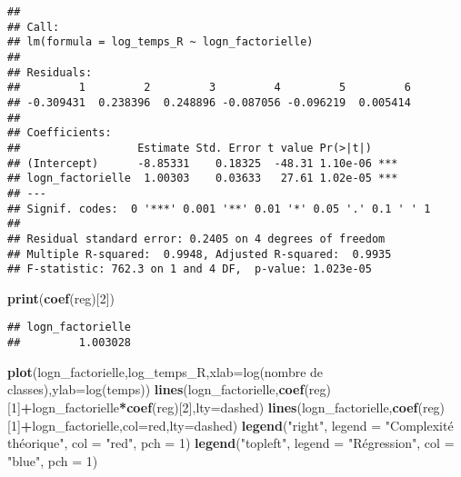 \documentclass[
]{article}
\newenvironment{Shaded}{\begin{snugshade}}{\end{snugshade}}
\newcommand{\AttributeTok}[1]{\textcolor[rgb]{0.13,0.29,0.53}{#1}}
\newcommand{\DecValTok}[1]{\textcolor[rgb]{0.00,0.00,0.81}{#1}}
\newcommand{\FunctionTok}[1]{\textcolor[rgb]{0.13,0.29,0.53}{\textbf{#1}}}
\newcommand{\NormalTok}[1]{#1}
\newcommand{\SpecialCharTok}[1]{\textcolor[rgb]{0.81,0.36,0.00}{\textbf{#1}}}
\newcommand{\StringTok}[1]{\textcolor[rgb]{0.31,0.60,0.02}{#1}}
\begin{document}
\begin{verbatim}
## 
## Call:
## lm(formula = log_temps_R ~ logn_factorielle)
## 
## Residuals:
##         1         2         3         4         5         6 
## -0.309431  0.238396  0.248896 -0.087056 -0.096219  0.005414 
## 
## Coefficients:
##                  Estimate Std. Error t value Pr(>|t|)    
## (Intercept)      -8.85331    0.18325  -48.31 1.10e-06 ***
## logn_factorielle  1.00303    0.03633   27.61 1.02e-05 ***
## ---
## Signif. codes:  0 '***' 0.001 '**' 0.01 '*' 0.05 '.' 0.1 ' ' 1
## 
## Residual standard error: 0.2405 on 4 degrees of freedom
## Multiple R-squared:  0.9948, Adjusted R-squared:  0.9935 
## F-statistic: 762.3 on 1 and 4 DF,  p-value: 1.023e-05
\end{verbatim}

\begin{Shaded}
\begin{Highlighting}[]
\FunctionTok{print}\NormalTok{(}\FunctionTok{coef}\NormalTok{(reg)[}\DecValTok{2}\NormalTok{])}
\end{Highlighting}
\end{Shaded}

\begin{verbatim}
## logn_factorielle 
##         1.003028
\end{verbatim}

\begin{Shaded}
\begin{Highlighting}[]
\FunctionTok{plot}\NormalTok{(logn\_factorielle,log\_temps\_R,}\AttributeTok{xlab=}\StringTok{\textquotesingle{}log(nombre de classes)\textquotesingle{}}\NormalTok{,}\AttributeTok{ylab=}\StringTok{\textquotesingle{}log(temps)\textquotesingle{}}\NormalTok{)}
\FunctionTok{lines}\NormalTok{(logn\_factorielle,}\FunctionTok{coef}\NormalTok{(reg)[}\DecValTok{1}\NormalTok{]}\SpecialCharTok{+}\NormalTok{logn\_factorielle}\SpecialCharTok{*}\FunctionTok{coef}\NormalTok{(reg)[}\DecValTok{2}\NormalTok{],}\AttributeTok{lty=}\StringTok{\textquotesingle{}dashed\textquotesingle{}}\NormalTok{)}
\FunctionTok{lines}\NormalTok{(logn\_factorielle,}\FunctionTok{coef}\NormalTok{(reg)[}\DecValTok{1}\NormalTok{]}\SpecialCharTok{+}\NormalTok{logn\_factorielle,}\AttributeTok{col=}\StringTok{\textquotesingle{}red\textquotesingle{}}\NormalTok{,}\AttributeTok{lty=}\StringTok{\textquotesingle{}dashed\textquotesingle{}}\NormalTok{)}
\FunctionTok{legend}\NormalTok{(}\StringTok{"right"}\NormalTok{, }\AttributeTok{legend =} \StringTok{"Complexité théorique"}\NormalTok{, }\AttributeTok{col =} \StringTok{"red"}\NormalTok{, }\AttributeTok{pch =} \DecValTok{1}\NormalTok{)}
\FunctionTok{legend}\NormalTok{(}\StringTok{"topleft"}\NormalTok{, }\AttributeTok{legend =} \StringTok{"Régression"}\NormalTok{, }\AttributeTok{col =} \StringTok{"blue"}\NormalTok{, }\AttributeTok{pch =} \DecValTok{1}\NormalTok{)}
\end{Highlighting}
\end{Shaded}
\end{document}
